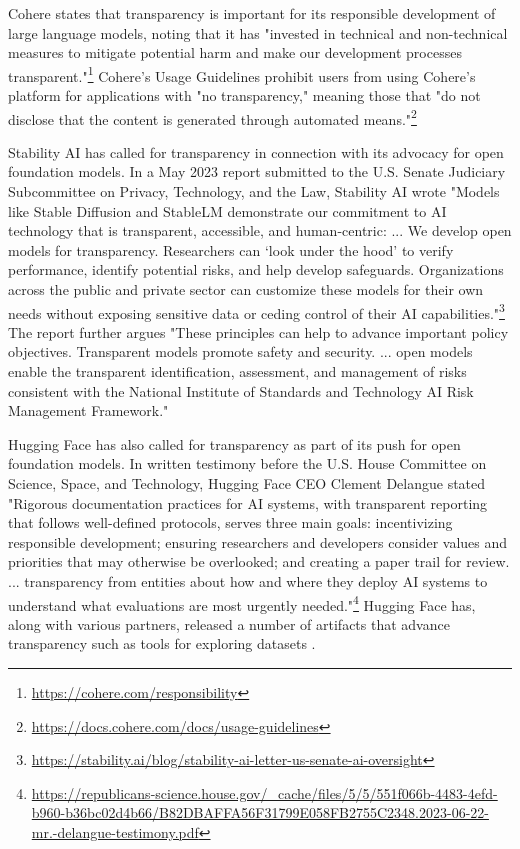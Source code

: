 Cohere states that transparency is important for its responsible development of large language models, noting that it has "invested in technical and non-technical measures to mitigate potential harm and make our development processes transparent."\footnote{\url{https://cohere.com/responsibility}} 
Cohere's Usage Guidelines prohibit users from using Cohere's platform for applications with "no transparency," meaning those that  "do not disclose that the content is generated through automated means."\footnote{\url{https://docs.cohere.com/docs/usage-guidelines}} 

Stability AI has called for transparency in connection with its advocacy for open foundation models. In a May 2023 report submitted to the U.S. Senate Judiciary Subcommittee on Privacy, Technology, and the Law, Stability AI wrote "Models like Stable Diffusion and StableLM demonstrate our commitment to AI technology that is transparent, accessible, and human-centric: ... We develop open models for transparency. Researchers can `look under the hood' to verify performance, identify potential risks, and help develop safeguards. Organizations across the public and private sector can customize these models for their own needs without exposing sensitive data or ceding control of their AI capabilities."\footnote{\url{https://stability.ai/blog/stability-ai-letter-us-senate-ai-oversight}} The report further argues "These principles can help to advance important policy objectives. Transparent models promote safety and security. ... open models enable the transparent identification, assessment, and management of risks consistent with the National Institute of Standards and Technology AI Risk Management Framework."

Hugging Face has also called for transparency as part of its push for open foundation models. In written testimony before the U.S. House Committee on Science, Space, and Technology, Hugging Face CEO Clement Delangue stated "Rigorous documentation practices for AI systems, with transparent reporting that follows well-defined protocols, serves three main goals: incentivizing responsible development; ensuring researchers and developers consider values and priorities that may otherwise be overlooked; and creating a paper trail for review. ... transparency from entities about how and where they deploy AI systems to understand what evaluations are most urgently needed."\footnote{\url{https://republicans-science.house.gov/_cache/files/5/5/551f066b-4483-4efd-b960-b36bc02d4b66/B82DBAFFA56F31799E058FB2755C2348.2023-06-22-mr.-delangue-testimony.pdf}} Hugging Face has, along with various partners, released a number of artifacts that advance transparency such as tools for exploring datasets \citep{piktus2023roots}. 

